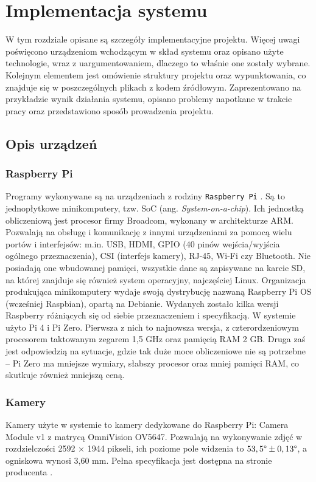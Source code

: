\chapter{Implementacja systemu}
\thispagestyle{chapterBeginStyle}

W tym rozdziale opisane są szczegóły implementacyjne projektu. Więcej uwagi poświęcono urządzeniom wchodzącym w skład systemu oraz opisano użyte technologie, wraz z uargumentowaniem, dlaczego to właśnie one zostały wybrane. Kolejnym elementem jest omówienie struktury projektu oraz wypunktowania, co znajduje się w poszczególnych plikach z kodem źródłowym. Zaprezentowano na przykładzie wynik działania systemu, opisano problemy napotkane w trakcie pracy oraz przedstawiono sposób prowadzenia projektu.

\section{Opis urządzeń}

\subsection{Raspberry Pi}
Programy wykonywane są na urządzeniach z rodziny \verb|Raspberry Pi| \cite{RPi}. Są to jednopłytkowe minikomputery, tzw. SoC (ang. \textit{System-on-a-chip}). Ich jednostką obliczeniową jest procesor firmy Broadcom, wykonany w architekturze ARM. Pozwalają na obsługę i komunikację z innymi urządzeniami za pomocą wielu portów i interfejsów: m.in. USB, HDMI, GPIO (40 pinów wejścia/wyjścia ogólnego przeznaczenia), CSI (interfejs kamery), RJ-45, Wi-Fi czy Bluetooth. Nie posiadają one wbudowanej pamięci, wszystkie dane są zapisywane na karcie SD, na której znajduje się również system operacyjny, najczęściej Linux. Organizacja produkująca minikomputery wydaje swoją dystrybucję nazwaną Raspberry Pi OS (wcześniej Raspbian), opartą na Debianie. Wydanych zostało kilka wersji Raspberry różniących się od siebie przeznaczeniem i specyfikacją. W systemie użyto Pi 4 i Pi Zero. Pierwsza z nich to najnowsza wersja, z czterordzeniowym procesorem taktowanym zegarem 1,5 GHz oraz pamięcią RAM 2 GB. Druga zaś jest odpowiedzią na sytuacje, gdzie tak duże moce obliczeniowe nie są potrzebne -- Pi Zero ma mniejsze wymiary, słabszy procesor oraz mniej pamięci RAM, co skutkuje również mniejszą ceną.
\subsection{Kamery}
Kamery użyte w systemie to kamery dedykowane do Raspberry Pi: Camera Module v1 z matrycą OmniVision OV5647. Pozwalają na wykonywanie zdjęć w rozdzielczości 2592 $\times$ 1944 pikseli, ich poziome pole widzenia to $53,5 \degree \pm 0,13 \degree$, a ogniskowa wynosi 3,60 mm. Pełna specyfikacja jest dostępna na stronie producenta \cite{RPi}.

